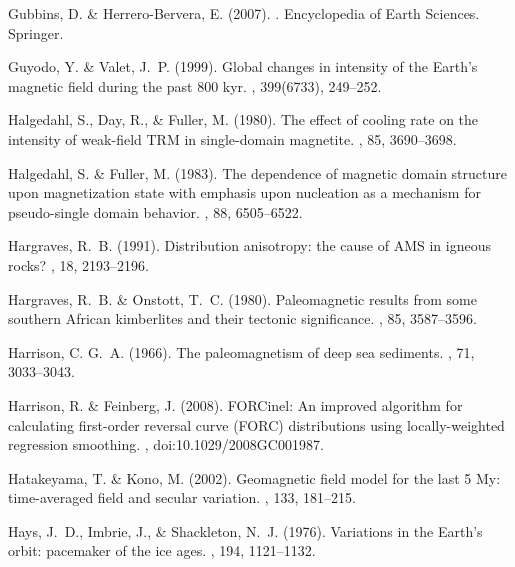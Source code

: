 Gubbins, D. \& Herrero-Bervera, E. (2007).
.
\newblock Encyclopedia of Earth Sciences. Springer.

Guyodo, Y. \& Valet, J.~P. (1999).
\newblock Global changes in intensity of the Earth's magnetic field during the
  past 800 kyr.
, 399(6733), 249--252.

Halgedahl, S., Day, R., \& Fuller, M. (1980).
\newblock The effect of cooling rate on the intensity of weak-field TRM in
  single-domain magnetite.
, 85, 3690--3698.

Halgedahl, S. \& Fuller, M. (1983).
\newblock The dependence of magnetic domain structure upon magnetization state
  with emphasis upon nucleation as a mechanism for pseudo-single domain
  behavior.
, 88, 6505--6522.

Hargraves, R.~B. (1991).
\newblock Distribution anisotropy: the cause of {AMS} in igneous rocks?
, 18, 2193--2196.

Hargraves, R.~B. \& Onstott, T.~C. (1980).
\newblock Paleomagnetic results from some southern African kimberlites and
  their tectonic significance.
, 85, 3587--3596.

Harrison, C. G.~A. (1966).
\newblock The paleomagnetism of deep sea sediments.
, 71, 3033--3043.

Harrison, R. \& Feinberg, J. (2008).
\newblock FORCinel: An improved algorithm for calculating first-order reversal
  curve (FORC) distributions using locally-weighted regression smoothing.
, doi:10.1029/2008GC001987.

Hatakeyama, T. \& Kono, M. (2002).
\newblock Geomagnetic field model for the last 5 My: time-averaged field and
  secular variation.
, 133, 181--215.

Hays, J.~D., Imbrie, J., \& Shackleton, N.~J. (1976).
\newblock Variations in the Earth's orbit: pacemaker of the ice ages.
, 194, 1121--1132.

